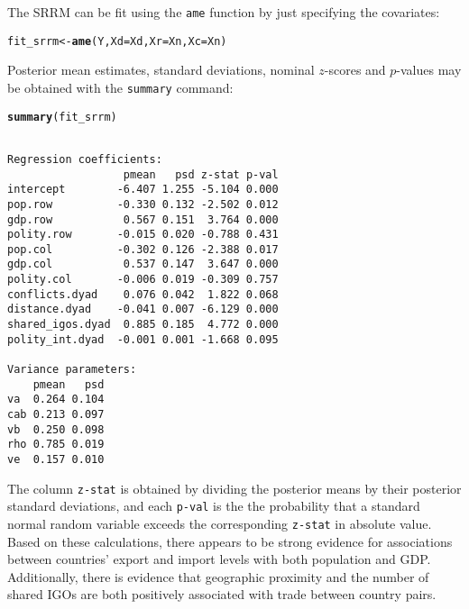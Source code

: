 \documentclass[11pt]{article}\usepackage[]{graphicx}\usepackage[]{color}
\makeatletter
\newcommand{\hlstd}[1]{\textcolor[rgb]{0.345,0.345,0.345}{#1}}%
\newcommand{\hlkwb}[1]{\textcolor[rgb]{0.69,0.353,0.396}{#1}}%
\newcommand{\hlkwc}[1]{\textcolor[rgb]{0.333,0.667,0.333}{#1}}%
\newcommand{\hlkwd}[1]{\textcolor[rgb]{0.737,0.353,0.396}{\textbf{#1}}}%
\newenvironment{kframe}{%
 \def\at@end@of@kframe{}%
 \ifinner\ifhmode%
  \def\at@end@of@kframe{\end{minipage}}%
  \begin{minipage}{\columnwidth}%
 \fi\fi%
 \def\FrameCommand##1{\hskip\@totalleftmargin \hskip-\fboxsep
 \colorbox{shadecolor}{##1}\hskip-\fboxsep
     \hskip-\linewidth \hskip-\@totalleftmargin \hskip\columnwidth}%
 \MakeFramed {\advance\hsize-\width
   \@totalleftmargin\z@ \linewidth\hsize
   \@setminipage}}%
 {\par\unskip\endMakeFramed%
 \at@end@of@kframe}
\newenvironment{knitrout}{}{} %
\makeatother
\begin{document}
The SRRM can be fit using the {\tt ame} function by just specifying the 
covariates:
\begin{knitrout}\footnotesize
{}\color{fgcolor}\begin{kframe}
\begin{alltt}
\hlstd{fit_srrm}\hlkwb{<-}\hlkwd{ame}\hlstd{(Y,}\hlkwc{Xd}\hlstd{=Xd,}\hlkwc{Xr}\hlstd{=Xn,}\hlkwc{Xc}\hlstd{=Xn)}
\end{alltt}
\end{kframe}
\end{knitrout}
Posterior mean estimates, standard deviations, nominal $z$-scores and $p$-values
may be obtained with the {\tt summary} command:
\begin{knitrout}\footnotesize
{}\color{fgcolor}\begin{kframe}
\begin{alltt}
\hlkwd{summary}\hlstd{(fit_srrm)}
\end{alltt}
\begin{verbatim}

Regression coefficients:
                  pmean   psd z-stat p-val
intercept        -6.407 1.255 -5.104 0.000
pop.row          -0.330 0.132 -2.502 0.012
gdp.row           0.567 0.151  3.764 0.000
polity.row       -0.015 0.020 -0.788 0.431
pop.col          -0.302 0.126 -2.388 0.017
gdp.col           0.537 0.147  3.647 0.000
polity.col       -0.006 0.019 -0.309 0.757
conflicts.dyad    0.076 0.042  1.822 0.068
distance.dyad    -0.041 0.007 -6.129 0.000
shared_igos.dyad  0.885 0.185  4.772 0.000
polity_int.dyad  -0.001 0.001 -1.668 0.095

Variance parameters:
    pmean   psd
va  0.264 0.104
cab 0.213 0.097
vb  0.250 0.098
rho 0.785 0.019
ve  0.157 0.010
\end{verbatim}
\end{kframe}
\end{knitrout}
The column {\tt z-stat} is obtained by dividing the posterior means by their 
posterior standard deviations, and each {\tt p-val} is the
the probability that a standard normal random variable 
exceeds the corresponding {\tt z-stat} in absolute value. 
Based on these calculations, there appears to be strong evidence for 
associations between countries' export and import levels with  both population and GDP. 
Additionally, there is evidence that geographic proximity and the number of 
shared IGOs are both positively associated with trade between country pairs. 
\end{document}
